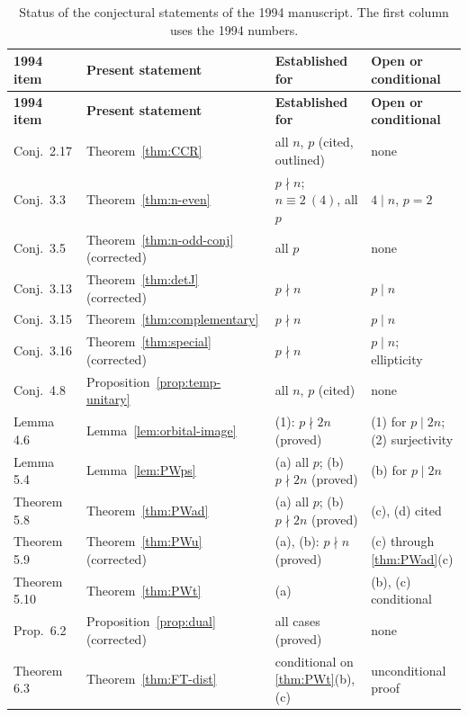 \documentclass[12pt,letterpaper]{article}
\numberwithin{equation}{section}
\theoremstyle{definition}
\begin{document}
{\small
\begin{longtable}{@{}>{\raggedright}p{2.1cm}>{\raggedright}p{4.6cm}>{\raggedright}p{4.3cm}>{\raggedright\arraybackslash}p{4.0cm}@{}}
\caption{Status of the conjectural statements of the 1994 manuscript.  The first column uses the 1994 numbers.}\label{tab:status}\\
\toprule
\textbf{1994 item} & \textbf{Present statement} & \textbf{Established for} & \textbf{Open or conditional}\\
\midrule
\endfirsthead
\toprule
\textbf{1994 item} & \textbf{Present statement} & \textbf{Established for} & \textbf{Open or conditional}\\
\midrule
\endhead
Conj.\ 2.17 & Theorem~\ref{thm:CCR} & all $n$, $p$ (cited, outlined) & none\\
Conj.\ 3.3 & Theorem~\ref{thm:n-even} & $p\nmid n$; $n\equiv2\ (4)$, all $p$ & $4\mid n$, $p=2$\\
Conj.\ 3.5 & Theorem~\ref{thm:n-odd-conj} (corrected) & all $p$ & none\\
Conj.\ 3.13 & Theorem~\ref{thm:detJ} (corrected) & $p\nmid n$ & $p\mid n$\\
Conj.\ 3.15 & Theorem~\ref{thm:complementary} & $p\nmid n$ & $p\mid n$\\
Conj.\ 3.16 & Theorem~\ref{thm:special} (corrected) & $p\nmid n$ & $p\mid n$; ellipticity\\
Conj.\ 4.8 & Proposition~\ref{prop:temp-unitary} & all $n$, $p$ (cited) & none\\
Lemma 4.6 & Lemma~\ref{lem:orbital-image} & (1): $p\nmid2n$ (proved) & (1) for $p\mid2n$; (2) surjectivity\\
Lemma 5.4 & Lemma~\ref{lem:PWps} & (a) all $p$; (b) $p\nmid2n$ (proved) & (b) for $p\mid2n$\\
Theorem 5.8 & Theorem~\ref{thm:PWad} & (a) all $p$; (b) $p\nmid2n$ (proved) & (c), (d) cited\\
Theorem 5.9 & Theorem~\ref{thm:PWu} (corrected) & (a), (b): $p\nmid n$ (proved) & (c) through \ref{thm:PWad}(c)\\
Theorem 5.10 & Theorem~\ref{thm:PWt} & (a) & (b), (c) conditional\\
Prop.\ 6.2 & Proposition~\ref{prop:dual} (corrected) & all cases (proved) & none\\
Theorem 6.3 & Theorem~\ref{thm:FT-dist} & conditional on \ref{thm:PWt}(b),(c) & unconditional proof\\
\bottomrule
\end{longtable}}
\end{document}
